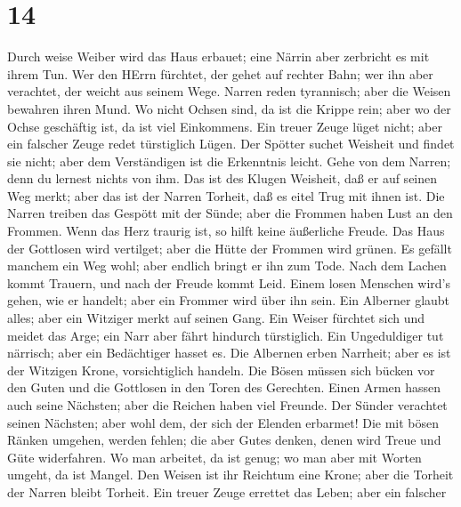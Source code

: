 \hypertarget{section-13}{%
\section{14}\label{section-13}}

 Durch weise Weiber wird das Haus erbauet; eine Närrin aber
zerbricht es mit ihrem Tun.  Wer den HErrn fürchtet, der
gehet auf rechter Bahn; wer ihn aber verachtet, der weicht aus seinem
Wege.  Narren reden tyrannisch; aber die Weisen bewahren
ihren Mund.  Wo nicht Ochsen sind, da ist die Krippe rein;
aber wo der Ochse geschäftig ist, da ist viel Einkommens. 
Ein treuer Zeuge lüget nicht; aber ein falscher Zeuge redet türstiglich
Lügen.  Der Spötter suchet Weisheit und findet sie nicht;
aber dem Verständigen ist die Erkenntnis leicht.  Gehe von
dem Narren; denn du lernest nichts von ihm.  Das ist des
Klugen Weisheit, daß er auf seinen Weg merkt; aber das ist der Narren
Torheit, daß es eitel Trug mit ihnen ist.  Die Narren
treiben das Gespött mit der Sünde; aber die Frommen haben Lust an den
Frommen.  Wenn das Herz traurig ist, so hilft keine
äußerliche Freude.  Das Haus der Gottlosen wird vertilget;
aber die Hütte der Frommen wird grünen.  Es gefällt manchem
ein Weg wohl; aber endlich bringt er ihn zum Tode.  Nach
dem Lachen kommt Trauern, und nach der Freude kommt Leid. 
Einem losen Menschen wird's gehen, wie er handelt; aber ein Frommer wird
über ihn sein.  Ein Alberner glaubt alles; aber ein
Witziger merkt auf seinen Gang.  Ein Weiser fürchtet sich
und meidet das Arge; ein Narr aber fährt hindurch türstiglich.
 Ein Ungeduldiger tut närrisch; aber ein Bedächtiger hasset
es.  Die Albernen erben Narrheit; aber es ist der Witzigen
Krone, vorsichtiglich handeln.  Die Bösen müssen sich
bücken vor den Guten und die Gottlosen in den Toren des Gerechten.
 Einen Armen hassen auch seine Nächsten; aber die Reichen
haben viel Freunde.  Der Sünder verachtet seinen Nächsten;
aber wohl dem, der sich der Elenden erbarmet!  Die mit
bösen Ränken umgehen, werden fehlen; die aber Gutes denken, denen wird
Treue und Güte widerfahren.  Wo man arbeitet, da ist genug;
wo man aber mit Worten umgeht, da ist Mangel.  Den Weisen
ist ihr Reichtum eine Krone; aber die Torheit der Narren bleibt Torheit.
 Ein treuer Zeuge errettet das Leben; aber ein falscher
